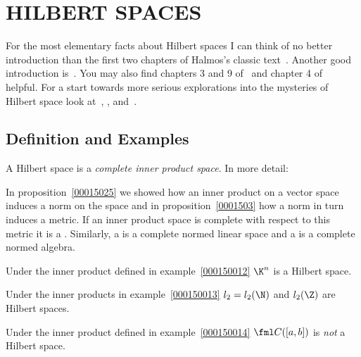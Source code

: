\chapter{HILBERT SPACES}

For the most elementary facts about Hilbert spaces I can think of no better introduction than the first two chapters
of Halmos's classic text~\cite{Halmos:1951}.  Another good introduction is~\cite{Young:1988}.  You may also find
chapters 3 and 9 of~\cite{Kreyszig:1978} and chapter 4 of~\cite{Ha:2006} helpful.  For a start towards more serious
explorations into the mysteries of Hilbert space look at~\cite{Conway:1990}, \cite{Conway:2000}, and~\cite{Helmberg:1969}.


\section{Definition and Examples}

A Hilbert space is a \emph{complete inner product space}.  In more detail:
\begin{defn} In proposition~\ref{00015025} we showed how an inner product on a vector space induces a norm on the space and in
proposition~\ref{0001503} how a norm in turn induces a metric.  If an inner product space is complete with respect to this metric
it is a
.  Similarly, a
 is a complete normed linear space and a
 is a complete normed algebra.
\end{defn}

\begin{exam} Under the inner product defined in
example~\ref{000150012} $\K^n$ is a Hilbert space.
\end{exam}

\begin{exam}\label{exam150013} Under the inner products in
example~\ref{000150013} $l_2 = l_2(\N)$ and $l_2(\Z)$ are Hilbert spaces.
\end{exam}

\begin{exam} Under the inner product defined in example~\ref{000150014} $\fml C([a,b])$ is \emph{not} a Hilbert space.
\end{exam}

